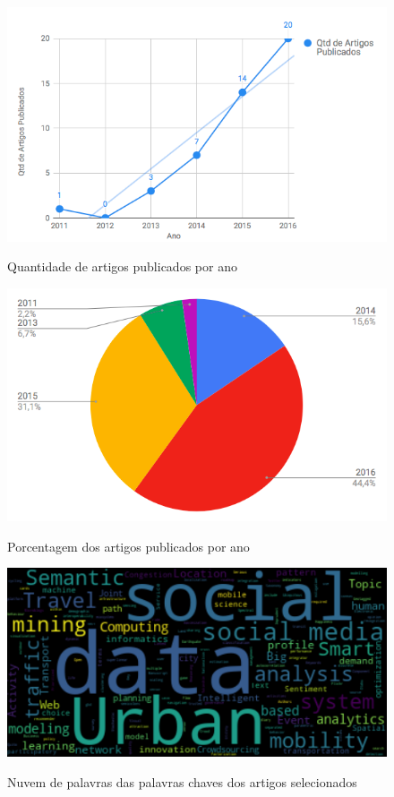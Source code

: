\documentclass[
	12pt,				%
	oneside,			%
	a4paper,			%
	english,			%
	brazil				%
	]{abntex2ppgsi}
\begin{document}
{{{\begin{figure}[H]%
	\centering
 	  \caption{Quantidade de artigos publicados por ano}
		\includegraphics[width=0.8\linewidth]{images/g1.png}
	\label{fig:qtd}
\end{figure}

\begin{figure}[H]%
	\centering
 	  \caption{Porcentagem dos artigos publicados por ano}
		\includegraphics[width=0.8\linewidth]{images/g2.png}
	\label{fig:porcentagem}
\end{figure}

\begin{figure}[H]%
	\centering
 	  \caption{Nuvem de palavras das palavras chaves dos artigos selecionados}
		\includegraphics[width=0.8\linewidth]{images/world_cloud_metodologia.png}
	\label{fig:w_cloud}
\end{figure}

}}}
\end{document}
